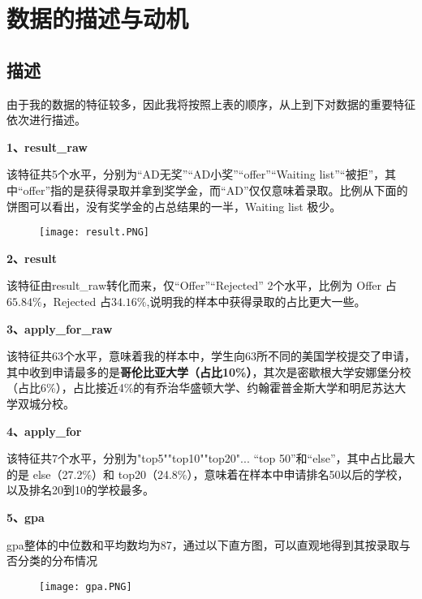 \documentclass[UTF8,cs4size]{ctexart}
\begin{document}
\section{\heiti 数据的描述与动机}
\subsection{\heiti 描述}
\par 由于我的数据的特征较多，因此我将按照上表的顺序，从上到下对数据的重要特征依次进行描述。

\par\noindent \textbf{1、result\_raw}
\par 该特征共5个水平，分别为“AD无奖”“AD小奖”“offer”“Waiting list”“被拒”，其中“offer”指的是获得录取并拿到奖学金，而“AD”仅仅意味着录取。比例从下面的饼图可以看出，没有奖学金的占总结果的一半，Waiting list 极少。
\vspace{-4ex}
\begin{figure}[h]
	\centering
	\texttt{[image: result.PNG]}
\end{figure}

\vspace{-1ex}
\par\noindent \textbf{2、result}
\par 该特征由result\_raw转化而来，仅“Offer”“Rejected” 2个水平，比例为 Offer 占$65.84\%$，Rejected 占$34.16\%$,说明我的样本中获得录取的占比更大一些。

\par\noindent \textbf{3、apply\_for\_raw}
\par 该特征共63个水平，意味着我的样本中，学生向63所不同的美国学校提交了申请，其中收到申请最多的是\textbf{哥伦比亚大学（占比10\%）}，其次是密歇根大学安娜堡分校（占比6\%），占比接近4\%的有乔治华盛顿大学、约翰霍普金斯大学和明尼苏达大学双城分校。

\par\noindent \textbf{4、apply\_for}
\par 该特征共7个水平，分别为"top5""top10""top20"... “top 50”和“else”，其中占比最大的是 else（27.2\%）和 top20（24.8\%），意味着在样本中申请排名50以后的学校，以及排名20到10的学校最多。

\par\noindent \textbf{5、gpa}
\par gpa整体的中位数和平均数均为87，通过以下直方图，可以直观地得到其按录取与否分类的分布情况
\vspace{-1ex}
\begin{figure}[h]
	\centering
	\texttt{[image: gpa.PNG]}
\end{figure}
\end{document}
